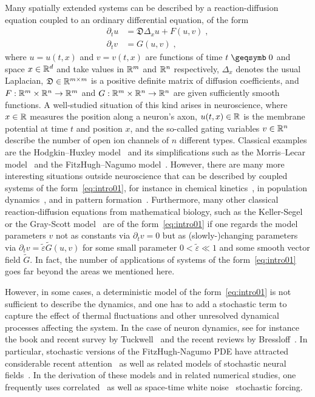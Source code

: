 \documentclass[reqno,11pt]{article}
\begin{document}
Many spatially extended systems can be described by a reaction-diffusion
equation coupled to an ordinary differential equation, of the form 
\begin{align}
\nonumber
\partial_t u &= \mathfrak{D} \Delta_x u + F(u,v)\;, \\
\partial_t v &= G(u,v)\;,
\label{eq:intro01} 
\end{align}
where $u=u(t,x)$ and $v=v(t,x)$ are functions of time $t\geqs0$ and space
$x\in\mathbb{R}^d$ and take values in $\mathbb{R}^m$ and $\mathbb{R}^n$ respectively, $\Delta_x$ denotes
the usual Laplacian, $\mathfrak{D}\in\mathbb{R}^{m\times m}$ is a positive definite
matrix of diffusion coefficients, and $F:\mathbb{R}^m\times \mathbb{R}^n\rightarrow \mathbb{R}^m$ and
$G:\mathbb{R}^m\times \mathbb{R}^n\rightarrow \mathbb{R}^n$ are given sufficiently smooth functions. A
well-studied situation of this kind arises in neuroscience, where $x\in\mathbb{R}$
measures the position along a neuron's axon, $u(t,x)\in\mathbb{R}$ is the membrane
potential at time $t$ and position $x$, and the so-called gating variables
$v\in\mathbb{R}^n$ describe the number of open ion channels of $n$ different
types. Classical examples are the Hodgkin--Huxley model~\cite{HodgkinHuxley52}
and its simplifications such as the Morris--Lecar model~\cite{MorrisLecar81} and
the FitzHugh--Nagumo model~\cite{FitzHugh61,Nagumo62}.  However, there are many
more interesting situations outside neuroscience that can be described by
coupled systems of the form~\eqref{eq:intro01}, for instance in chemical
kinetics~\cite{TysonKeener}, in population dynamics~\cite{CantrellCosner}, and
in pattern formation~\cite{Barkley2}. Furthermore, many other classical
reaction-diffusion equations from mathematical biology, such as the Keller-Segel
\cite{KellerSegel} or the Gray-Scott model~\cite{GiererMeinhardt} are of the
form~\eqref{eq:intro01} if one regards the model parameters $v$ not as constants
via $\partial_t v = 0$ but as (slowly-)changing parameters via $\partial_t
v=\tilde{\varepsilon} \widetilde{G}(u,v)$ for some small parameter
$0<\tilde\varepsilon \ll1$ \cite{KuehnBook} and some smooth vector field
$\widetilde{G}$. In fact, the number of applications of systems of the
form~\eqref{eq:intro01} goes far beyond the areas we mentioned here.

However, in some cases, a deterministic model of the form~\eqref{eq:intro01} is
not sufficient to describe the dynamics, and one has to add a stochastic term to
capture the effect of thermal fluctuations and other unresolved dynamical
processes affecting the system. In the case of neuron dynamics, see for instance
the book and recent survey by Tuckwell~\cite{Tuckwell,Tuckwell2} and the recent
reviews by Bressloff~\cite{Bressloff_2012,Bressloff_2014}. In particular,
stochastic versions of the FitzHugh-Nagumo PDE have attracted considerable
recent attention~\cite{Tuckwell1,Tuckwell_Jost_2011,SauerStannat1} as well as
related models of stochastic neural
fields~\cite{KuehnRiedler,Kruger_Stannat_2014}. In the derivation of these
models and in related numerical studies, one frequently uses
correlated~\cite{LordPowellShardlow} as well as space-time white
noise~\cite{AlzubaidiShardlow} stochastic forcing.
\end{document}
